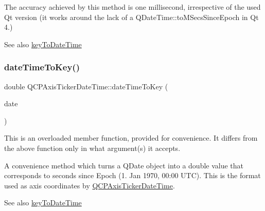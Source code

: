 The accuracy achieved by this method is one millisecond, irrespective of the used Qt version (it works around the lack of a Q\+Date\+Time\+::to\+M\+Secs\+Since\+Epoch in Qt 4.)

\begin{DoxySeeAlso}{See also}
\hyperlink{class_q_c_p_axis_ticker_date_time_a4c1761ad057f5564804a53f942629b53}{key\+To\+Date\+Time} 
\end{DoxySeeAlso}
\mbox{\label{class_q_c_p_axis_ticker_date_time_ad87afc7dba65843f68da5ca88bc004f4}} 
\subsubsection{\texorpdfstring{date\+Time\+To\+Key()}{dateTimeToKey()}\hspace{0.1cm}{\footnotesize\ttfamily [2/2]}}
{\footnotesize\ttfamily double Q\+C\+P\+Axis\+Ticker\+Date\+Time\+::date\+Time\+To\+Key (\begin{DoxyParamCaption}\item[{const Q\+Date}]{date }\end{DoxyParamCaption})\hspace{0.3cm}{\ttfamily [static]}}

This is an overloaded member function, provided for convenience. It differs from the above function only in what argument(s) it accepts.

A convenience method which turns a Q\+Date object into a double value that corresponds to seconds since Epoch (1. Jan 1970, 00\+:00 U\+TC). This is the format used as axis coordinates by \hyperlink{class_q_c_p_axis_ticker_date_time}{Q\+C\+P\+Axis\+Ticker\+Date\+Time}.

\begin{DoxySeeAlso}{See also}
\hyperlink{class_q_c_p_axis_ticker_date_time_a4c1761ad057f5564804a53f942629b53}{key\+To\+Date\+Time} 
\end{DoxySeeAlso}
\mbox{\label{class_q_c_p_axis_ticker_date_time_a4c1761ad057f5564804a53f942629b53}} 
